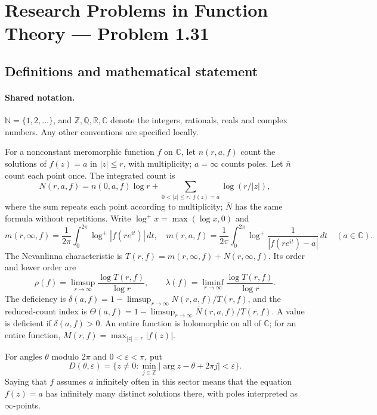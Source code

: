 \documentclass[11pt]{article}
\begin{document}
\section{Research Problems in Function Theory — Problem 1.31}\label{statement}

\subsection{Definitions and mathematical statement}

\paragraph{Shared notation.}$\mathbb N=\{1,2,\ldots\}$, and $\mathbb Z,\mathbb Q,\mathbb R,\mathbb C$ denote the integers, rationals, reals and complex numbers. Any other conventions are specified locally.


For a nonconstant meromorphic function $f$ on $\mathbb C$, let $n(r,a,f)$ count the solutions of $f(z)=a$ in $|z|\le r$, with multiplicity; $a=\infty$ counts poles. Let $\bar n$ count each point once. The integrated count is
\[
 N(r,a,f)=n(0,a,f)\log r+\sum_{0<|z|\le r,\ f(z)=a}\log(r/|z|),
\]
where the sum repeats each point according to multiplicity; $\bar N$ has the same formula without repetitions. Write $\log^+x=\max(\log x,0)$ and
\[
 m(r,\infty,f)=\frac1{2\pi}\int_0^{2\pi}\log^+|f(re^{it})|\,dt,\quad
 m(r,a,f)=\frac1{2\pi}\int_0^{2\pi}\log^+\frac1{|f(re^{it})-a|}\,dt\quad(a\in\mathbb C).
\]
The Nevanlinna characteristic is $T(r,f)=m(r,\infty,f)+N(r,\infty,f)$. Its order and lower order are
\[
 \rho(f)=\limsup_{r\to\infty}\frac{\log T(r,f)}{\log r},\qquad
 \lambda(f)=\liminf_{r\to\infty}\frac{\log T(r,f)}{\log r}.
\]
The deficiency is $\delta(a,f)=1-\limsup_{r\to\infty}N(r,a,f)/T(r,f)$, and the reduced-count index is $\Theta(a,f)=1-\limsup_{r\to\infty}\bar N(r,a,f)/T(r,f)$. A value is deficient if $\delta(a,f)>0$. An entire function is holomorphic on all of $\mathbb C$; for an entire function, $M(r,f)=\max_{|z|=r}|f(z)|$.

For angles $\theta$ modulo $2\pi$ and $0<\varepsilon<\pi$, put
\[
 D(\theta,\varepsilon)=\{z\ne0:\min_{j\in\mathbb Z}|\arg z-\theta+2\pi j|<\varepsilon\}.
\]
Saying that $f$ assumes $a$ infinitely often in this sector means that the equation $f(z)=a$ has infinitely many distinct solutions there, with poles interpreted as $\infty$-points.
\end{document}
